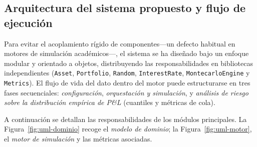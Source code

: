 
\subsection{Arquitectura del sistema propuesto y flujo de ejecución}
\label{subsec:arquitectura-sistema}

Para evitar el acoplamiento rígido de componentes---un defecto habitual en motores de simulación académicos---, el sistema se ha diseñado bajo un enfoque modular y orientado a objetos, distribuyendo las responsabilidades en bibliotecas independientes (\texttt{Asset}, \texttt{Portfolio}, \texttt{Random}, \texttt{InterestRate}, \texttt{MontecarloEngine} y \texttt{Metrics}). El flujo de vida del dato dentro del motor puede estructurarse en tres fases secuenciales: \emph{configuración}, \emph{orquestación y simulación}, y \emph{análisis de riesgo sobre la distribución empírica de P\&L} (cuantiles y métricas de cola).

A continuación se detallan las responsabilidades de los módulos principales. La Figura~\ref{fig:uml-dominio} recoge el \emph{modelo de dominio}; la Figura~\ref{fig:uml-motor}, el \emph{motor de simulación} y las métricas asociadas.


